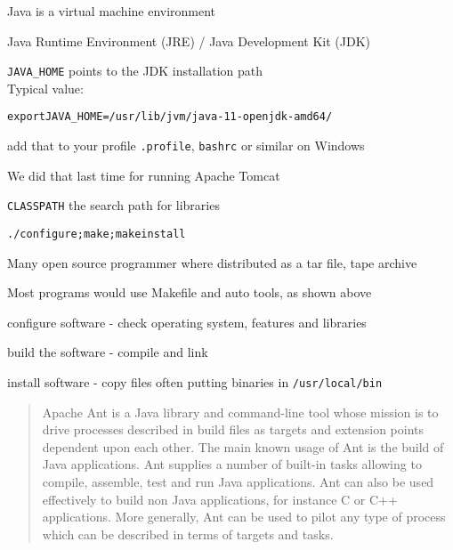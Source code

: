 \documentclass[Screen16to9,17pt]{foils}
\begin{document}

\begin{list2}
\item Java is a virtual machine environment
\item Java Runtime Environment (JRE) / Java Development Kit (JDK)
\end{list2}


\begin{list2}
\item \verb+JAVA_HOME+ points to the JDK installation path\\
Typical value:
\begin{alltt}
export JAVA_HOME=/usr/lib/jvm/java-11-openjdk-amd64/
\end{alltt}
add that to your profile \verb+.profile+, \verb+bashrc+ or similar on Windows
\item We did that last time for running Apache Tomcat
\item \verb+CLASSPATH+ the search path for libraries
\end{list2}





\begin{alltt}
./configure;make;make install
\end{alltt}

\begin{list1}
\item Many open source programmer where distributed as a tar file, tape archive
\item Most programs would use Makefile and auto tools, as shown above
\begin{list2}
\item configure software - check operating system, features and libraries
\item build the software - compile and link
\item install software - copy files often putting binaries in \verb+/usr/local/bin+
\end{list2}
\end{list1}







\begin{quote}
Apache Ant is a Java library and command-line tool whose mission is to drive processes described in build files as targets and extension points dependent upon each other. The main known usage of Ant is the build of Java applications. Ant supplies a number of built-in tasks allowing to compile, assemble, test and run Java applications. Ant can also be used effectively to build non Java applications, for instance C or C++ applications. More generally, Ant can be used to pilot any type of process which can be described in terms of targets and tasks.
\end{quote}
\end{document}
